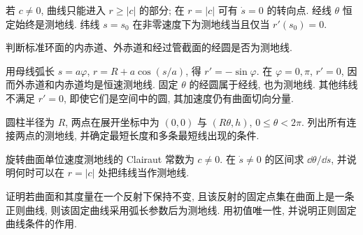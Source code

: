 若 $c\ne0$, 曲线只能进入 $r\ge|c|$ 的部分; 在 $r=|c|$ 可有 $\dot s=0$ 的转向点. 经线 $\theta$ 恒定始终是测地线. 纬线 $s=s_0$ 在非零速度下为测地线当且仅当 $r'(s_0)=0$.
\begin{example}
判断标准环面的内赤道、外赤道和经过管截面的经圆是否为测地线.
\end{example}
\begin{solution}
用母线弧长 $s=a\varphi$, $r=R+a\cos(s/a)$, 得 $r'=-\sin\varphi$. 在 $\varphi=0,\pi$, $r'=0$, 因而外赤道和内赤道均是恒速测地线. 固定 $\theta$ 的经圆属于经线, 也为测地线. 其他纬线不满足 $r'=0$, 即使它们是空间中的圆, 其加速度仍有曲面切向分量.
\end{solution}
\begin{exercise}\label{ex:8a}
圆柱半径为 $R$, 两点在展开坐标中为 $(0,0)$ 与 $(R\theta,h)$, $0\le\theta<2\pi$. 列出所有连接两点的测地线, 并确定最短长度和多条最短线出现的条件.
\end{exercise}
\begin{exercise}\label{ex:8b}
旋转曲面单位速度测地线的 Clairaut 常数为 $c\ne0$. 在 $\dot s\ne0$ 的区间求 $\dd\theta/\dd s$, 并说明何时可以在 $r=|c|$ 处把纬线当作测地线.
\end{exercise}
\begin{exercise}\label{ex:8c}
证明若曲面和其度量在一个反射下保持不变, 且该反射的固定点集在曲面上是一条正则曲线, 则该固定曲线采用弧长参数后为测地线. 用初值唯一性, 并说明正则固定曲线条件的作用.
\end{exercise}
